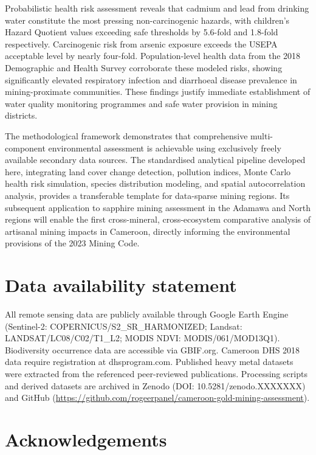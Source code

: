 \documentclass[preprint,12pt,authoryear]{elsarticle}
\begin{document}
Probabilistic health risk assessment reveals that cadmium and lead from drinking water constitute the most pressing non-carcinogenic hazards, with children's Hazard Quotient values exceeding safe thresholds by 5.6-fold and 1.8-fold respectively. Carcinogenic risk from arsenic exposure exceeds the USEPA acceptable level by nearly four-fold. Population-level health data from the 2018 Demographic and Health Survey corroborate these modeled risks, showing significantly elevated respiratory infection and diarrhoeal disease prevalence in mining-proximate communities. These findings justify immediate establishment of water quality monitoring programmes and safe water provision in mining districts.

The methodological framework demonstrates that comprehensive multi-component environmental assessment is achievable using exclusively freely available secondary data sources. The standardised analytical pipeline developed here, integrating land cover change detection, pollution indices, Monte Carlo health risk simulation, species distribution modeling, and spatial autocorrelation analysis, provides a transferable template for data-sparse mining regions. Its subsequent application to sapphire mining assessment in the Adamawa and North regions will enable the first cross-mineral, cross-ecosystem comparative analysis of artisanal mining impacts in Cameroon, directly informing the environmental provisions of the 2023 Mining Code.


\section*{Data availability statement}

All remote sensing data are publicly available through Google Earth Engine (Sentinel-2: COPERNICUS/S2\_SR\_HARMONIZED; Landsat: LANDSAT/LC08/C02/T1\_L2; MODIS NDVI: MODIS/061/MOD13Q1). Biodiversity occurrence data are accessible via GBIF.org. Cameroon DHS 2018 data require registration at dhsprogram.com. Published heavy metal datasets were extracted from the referenced peer-reviewed publications. Processing scripts and derived datasets are archived in Zenodo (DOI: 10.5281/zenodo.XXXXXXX) and GitHub (\url{https://github.com/rogeerpanel/cameroon-gold-mining-assessment}).


\section*{Acknowledgements}
\end{document}
